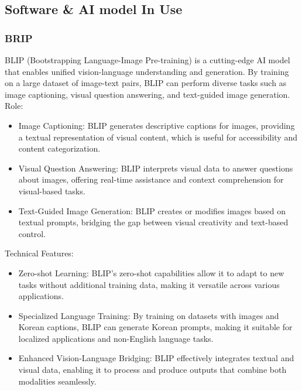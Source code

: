 \documentclass[conference]{IEEEtran}
\begin{document}
\subsection{Software \& AI model In Use}

\subsubsection{BRIP}

\noindent BLIP (Bootstrapping Language-Image Pre-training) is a cutting-edge AI model that enables unified vision-language understanding and generation. By training on a large dataset of image-text pairs, BLIP can perform diverse tasks such as image captioning, visual question answering, and text-guided image generation.\\

Role: 
\begin{itemize}
    \item Image Captioning: BLIP generates descriptive captions for images, providing a textual representation of visual content, which is useful for accessibility and content categorization.\\
    \item Visual Question Answering: BLIP interprets visual data to answer questions about images, offering real-time assistance and context comprehension for visual-based tasks.\\
    \item Text-Guided Image Generation: BLIP creates or modifies images based on textual prompts, bridging the gap between visual creativity and text-based control.\\
\end{itemize}

Technical Features:
\begin{itemize}
    \item Zero-shot Learning: BLIP’s zero-shot capabilities allow it to adapt to new tasks without additional training data, making it versatile across various applications.\\
    \item Specialized Language Training: By training on datasets with images and Korean captions, BLIP can generate Korean prompts, making it suitable for localized applications and non-English language tasks.\\
    \item Enhanced Vision-Language Bridging: BLIP effectively integrates textual and visual data, enabling it to process and produce outputs that combine both modalities seamlessly.\\
\end{itemize}
\end{document}
